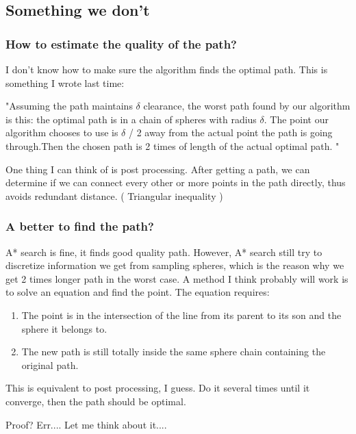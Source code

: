 \documentclass{article}
\begin{document}
  \subsection{Something we don't}
    \subsubsection{How to estimate the quality of the path?}
      I don't know how to make sure the algorithm finds the optimal path. This is something I wrote last time:

        "Assuming the path maintains $\delta$ clearance, the worst path found by our algorithm is this: the optimal path is in a chain of spheres with radius $\delta$. The point our algorithm chooses to use is $\delta$ / 2 away from the actual point the path is going through.Then the chosen path is 2 times of length of the actual optimal path. "

      One thing I can think of is post processing. After getting a path, we can determine if we can connect every other or more points in the path directly, thus avoids redundant distance. ( Triangular inequality ) 

    \subsubsection{A better to find the path?}
      A* search is fine, it finds good quality path. However, A* search still try to discretize information we get from sampling spheres, which is the reason why we get 2 times longer path in the worst case. A method I think probably will work is to solve an equation and find the point. The equation requires: 
      \begin{enumerate}
        \item The point is in the intersection of the line from its parent to its son and the sphere it belongs to.
        \item The new path is still totally inside the same sphere chain containing the original path. 
      \end{enumerate}
      
      This is equivalent to post processing, I guess. Do it several times until it converge, then the path should be optimal.

      Proof? Err.... Let me think about it....  
\end{document}
